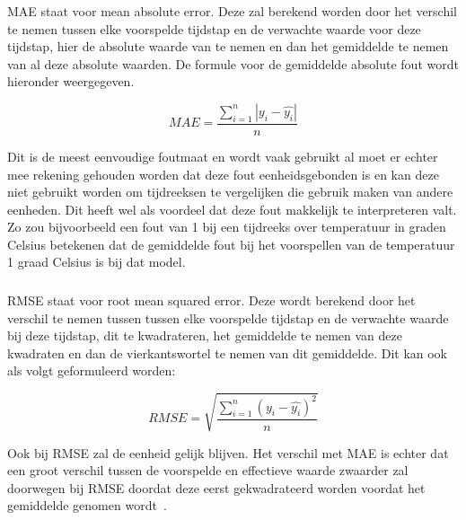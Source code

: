 \subsubsection{}
MAE staat voor mean absolute error. Deze zal berekend worden door het verschil te nemen tussen elke voorspelde tijdstap en de verwachte waarde voor deze tijdstap, hier de absolute waarde van te nemen en dan het gemiddelde te nemen van al deze absolute waarden. De formule voor de gemiddelde absolute fout wordt hieronder weergegeven.

\begin{equation}
MAE = \frac{\sum_{i=1}^{n} |y_i - \hat{y_i}|}{n}
\end{equation}

Dit is de meest eenvoudige foutmaat en wordt vaak gebruikt al moet er echter mee rekening gehouden worden dat deze fout eenheidsgebonden is en kan deze niet gebruikt worden om tijdreeksen te vergelijken die gebruik maken van andere eenheden. Dit heeft wel als voordeel dat deze fout makkelijk te interpreteren valt. Zo zou bijvoorbeeld een fout van 1 bij een tijdreeks over temperatuur in graden Celsius betekenen dat de gemiddelde fout bij het voorspellen van de temperatuur 1 graad Celsius is bij dat model.

\subsubsection{}

RMSE staat voor root mean squared error. Deze wordt berekend door het verschil te nemen tussen tussen elke voorspelde tijdstap en de verwachte waarde bij deze tijdstap, dit te kwadrateren, het gemiddelde te nemen van deze kwadraten en dan de vierkantswortel te nemen van dit gemiddelde.
Dit kan ook als volgt geformuleerd worden:

\begin{equation}
RMSE = \sqrt{\frac{\sum_{i=1}^{n} (y_i - \hat{y_i})^2}{n}}
\end{equation}

Ook bij RMSE zal de eenheid gelijk blijven. Het verschil met MAE is echter dat een groot verschil tussen de voorspelde en effectieve waarde zwaarder zal doorwegen bij RMSE doordat deze eerst gekwadrateerd worden voordat het gemiddelde genomen wordt~\autocite{Kampakis2020}.

\subsubsection{}


